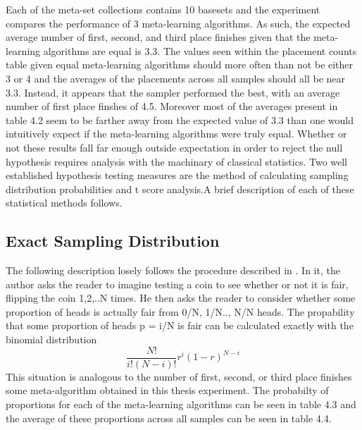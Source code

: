Each of the meta-set collections contains 10 basesets and the experiment
compares the performance of 3 meta-learning algorithms. As such, the expected
average number of first, second, and third place finishes given that the
meta-learning algorithms are equal is 3.3. The values seen within the placement
counts table given equal meta-learning algorithms should more often than not be
either 3 or 4 and the averages of the placements across all samples should all
be near 3.3. Instead, it appears that the sampler performed the best,
with an average number of first place finshes of 4.5. Moreover most of the
averages present in table 4.2 seem to be farther away from the expected value of
3.3 than one would intuitively expect if the meta-learning algorithms were
truly equal. Whether or not these results fall far enough outside
expectation in order to reject the null hypothesis requires analysis with the
machinary of classical statistics. Two well established hypothesis testing
measures are the method of calculating sampling distribution probabilities and
t score analysis.A brief description of each of these statistical methods
follows.

\subsection{Exact Sampling Distribution}
The following description losely follows the procedure described in \cite{Cohen}.
In it, the author asks the reader to imagine testing a coin to see whether or
not it is fair, flipping the coin 1,2,..N times. He then asks the reader to
consider whether some proportion of heads is actually fair from 0/N, 1/N.., N/N
heads. The propability that some proportion of heads p = i/N is fair can be
calculated exactly with the binomial distribution
$$\frac{N!}{i!(N-i)!}r^{i}(1-r)^{N-i}$$
This situation is analogous to the number of first, second, or third place
finishes some meta-algorithm obtained in this thesis experiment. The probabilty
of proportions for each of the meta-learning algorithms can be seen in table 4.3
and the average of these proportions across all samples can be seen in table 4.4.

